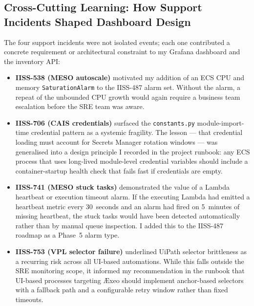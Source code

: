 \subsection{Cross-Cutting Learning: How Support Incidents Shaped Dashboard Design}

The four support incidents were not isolated events; each one contributed a
concrete requirement or architectural constraint to my Grafana dashboard and
the inventory API:

\begin{itemize}
    \item \textbf{IISS-538 (MESO autoscale)} motivated my addition of an ECS
          CPU and memory \texttt{SaturationAlarm} to the IISS-487 alarm set.
          Without the alarm, a repeat of the unbounded CPU growth would again
          require a business team escalation before the SRE team was aware.

    \item \textbf{IISS-706 (CAIS credentials)} surfaced the \texttt{constants.py}
          module-import-time credential pattern as a systemic fragility. The
          lesson --- that credential loading must account for Secrets Manager
          rotation windows --- was generalised into a design principle I recorded
          in the project runbook: any ECS process that uses long-lived
          module-level credential variables should include a container-startup
          health check that fails fast if credentials are empty.

    \item \textbf{IISS-741 (MESO stuck tasks)} demonstrated the value of a
          Lambda heartbeat or execution timeout alarm. If the executing Lambda
          had emitted a heartbeat metric every 30~seconds and an alarm had
          fired on 5~minutes of missing heartbeat, the stuck tasks would have
          been detected automatically rather than by manual queue inspection.
          I added this to the IISS-487 roadmap as a Phase~5 alarm type.

    \item \textbf{IISS-753 (VPL selector failure)} underlined UiPath selector
          brittleness as a recurring risk across all UI-based automations.
          While this falls outside the SRE monitoring scope, it informed my
          recommendation in the runbook that UI-based processes targeting
          \AE xeo should implement anchor-based selectors with a fallback path
          and a configurable retry window rather than fixed timeouts.
\end{itemize}

